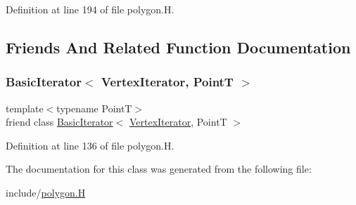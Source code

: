 Definition at line 194 of file polygon.\+H.



\subsection{Friends And Related Function Documentation}
\mbox{\label{class_designar_1_1_gen_polygon_1_1_vertex_iterator_a580630487e8bbe9b1152cc636325bee6}} 
\subsubsection{\texorpdfstring{Basic\+Iterator$<$ Vertex\+Iterator, Point\+T $>$}{BasicIterator< VertexIterator, PointT >}}
{\footnotesize\ttfamily template$<$typename PointT$>$ \\
friend class \hyperlink{class_designar_1_1_basic_iterator}{Basic\+Iterator}$<$ \hyperlink{class_designar_1_1_gen_polygon_1_1_vertex_iterator}{Vertex\+Iterator}, PointT $>$\hspace{0.3cm}{\ttfamily [friend]}}



Definition at line 136 of file polygon.\+H.



The documentation for this class was generated from the following file\+:\begin{DoxyCompactItemize}
\item 
include/\hyperlink{polygon_8_h}{polygon.\+H}\end{DoxyCompactItemize}
